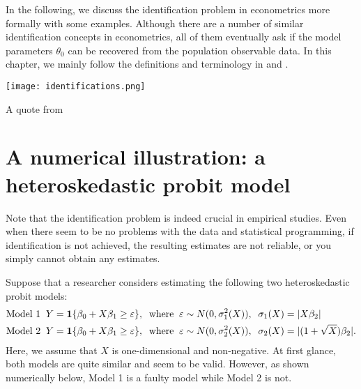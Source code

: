 \documentclass[11pt, A4paper, openany, uplatex]{book}
\begin{document}
In the following, we discuss the identification problem in econometrics more formally with some examples.
Although there are a number of similar identification concepts in econometrics, all of them eventually ask if the model parameters $\theta_0$ can be recovered from the population observable data.
In this chapter, we mainly follow the definitions and terminology in \cite{hurwicz1950generalization} and \cite{matzkin2013nonparametric}.
\begin{screen}
\begin{center}
	\texttt{[image: identifications.png]}

	\footnotesize
	A quote from \cite{lewbel2019identification}
	\normalsize
\end{center}
\end{screen}

\section{A numerical illustration: a heteroskedastic probit model}
Note that the identification problem is indeed crucial in empirical studies.
Even when there seem to be no problems with the data and statistical programming, if identification is not achieved, the resulting estimates are not reliable, or you simply cannot obtain any estimates.

Suppose that a researcher considers estimating the following two heteroskedastic probit models:
\begin{align*}
	\text{Model 1} & \;\; Y = \mathbf{1}\{\beta_0 + X \beta_1 \ge \varepsilon\}, \;\; \text{where} \;\; \varepsilon \sim N(0, \sigma^2_1(X)), \;\; \sigma_1(X) = |X\beta_2| \\
	\text{Model 2} & \;\; Y = \mathbf{1}\{\beta_0 + X \beta_1 \ge \varepsilon\}, \;\; \text{where} \;\; \varepsilon \sim N(0, \sigma^2_2(X)), \;\; \sigma_2(X) = |(1 + \sqrt{X})\beta_2|.
\end{align*}
Here, we assume that $X$ is one-dimensional and non-negative.
At first glance, both models are quite similar and seem to be valid.
However, as shown numerically below, Model 1 is a faulty model while Model 2 is not.
\end{document}
